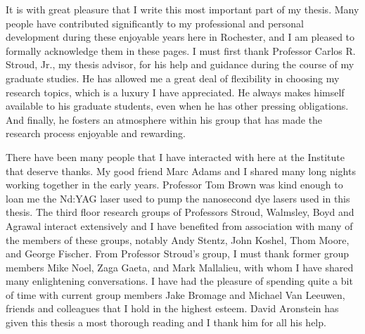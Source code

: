 \newpage




It is with great pleasure that I write this most important part of my
thesis.  Many people have contributed significantly to my professional and
personal development during these enjoyable years here in Rochester, and I am
pleased to formally acknowledge them in these pages.  I must first thank
Professor Carlos R. Stroud, Jr., my thesis advisor, for his help and guidance
during the course of my graduate studies.  He has allowed me a great deal
of flexibility in choosing my research topics, which is a luxury I have
appreciated.  He always makes himself available to his graduate students,
even when he has other pressing obligations.  And finally, he fosters an
atmosphere within his group that has made the research process enjoyable
and rewarding.

There have been many people that I have interacted with here at the Institute
that deserve thanks.  My good friend Marc Adams and I shared many long nights
working together in the early years.  Professor Tom Brown was kind enough to
loan me the Nd:YAG laser used to pump the nanosecond dye lasers used in this
thesis.  The third floor research groups of Professors Stroud, Walmsley, Boyd
and Agrawal interact extensively and I have benefited from association with many
of the members of these groups, notably Andy Stentz, John Koshel, Thom Moore,
and George Fischer.  From Professor Stroud's group, I must thank former group
members Mike Noel, Zaga Gaeta, and Mark Mallalieu, with whom I have
shared many enlightening conversations.  I have had the pleasure of spending
quite a bit of time with current group members Jake Bromage and Michael Van
Leeuwen, friends and colleagues that I hold in the highest esteem.  David
Aronstein has given this thesis a most thorough reading and I thank him for
all his help.

